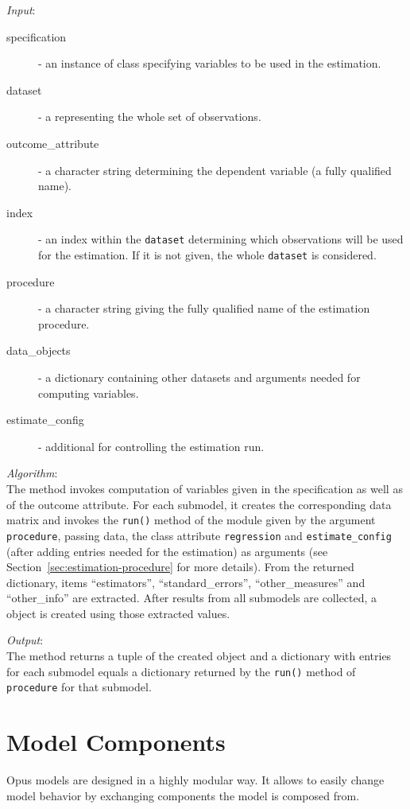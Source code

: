 {{\it Input}:
\begin{description}
\item[specification] - an instance of class 
  specifying variables \variablesindex to be used in the estimation.
\item[dataset] \datasetindex - a  \datasetindex representing the whole set of observations.
\item[outcome_attribute] - a character string determining the dependent
  variable \variablesindex (a fully qualified name).
\item[index] - an index within the \verb|dataset| \datasetindex determining which
  observations will be used for the estimation. If it is not given, the whole
  \verb|dataset| \datasetindex is considered.
\item[procedure] - a character string giving the fully qualified name of the
  estimation procedure.
\item[data_objects] - a dictionary containing other datasets \datasetindex and arguments
  needed for computing variables. \variablesindex
\item[estimate_config] - additional  for controlling the
  estimation run.
\end{description}

{\it Algorithm}:~\\[1mm]
The method invokes computation of variables \variablesindex given in the specification as well
as of the outcome attribute. \attributesindex For each submodel, it creates the corresponding
data matrix and invokes the \verb|run()| method of the module given by the
argument \verb|procedure|, passing data, the class attribute \attributesindex \verb|regression|
and \verb|estimate_config| (after adding entries needed for the estimation) as
arguments (see Section~\ref{sec:estimation-procedure} for more details). From
the returned dictionary, items ``estimators'', ``standard_errors'',
``other_measures'' and ``other_info'' are extracted.  After results from all
submodels are collected, a  \coefficientsindex object is created using those
extracted values.

{\it Output}:~\\[1mm]
The method returns a tuple of the created  object and a
dictionary with entries for each submodel equals a dictionary returned by the
\verb|run()| method of \verb|procedure| for that submodel.


\section{Model Components}
%
\label{sec:model-components}
Opus models are designed in a highly modular way. It allows to easily change
model behavior by exchanging components the model is composed from.

}
